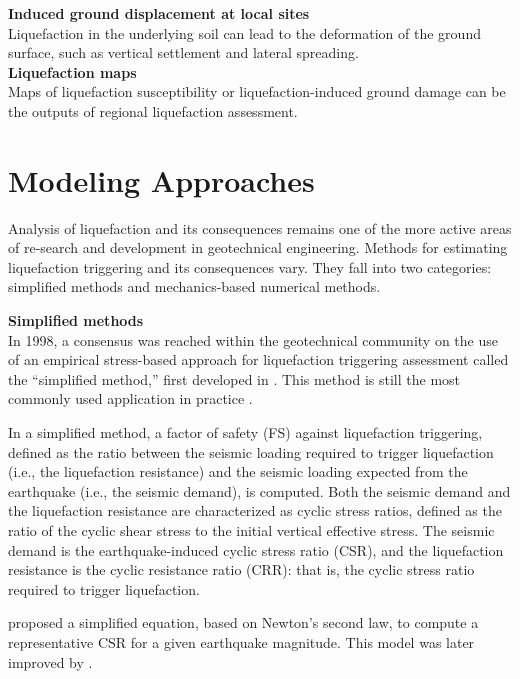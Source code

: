 \noindent\textbf{Induced ground displacement at local sites}\\
Liquefaction in the underlying soil can lead to the deformation of the ground surface, such as vertical settlement and lateral spreading. \\

\noindent\textbf{Liquefaction maps}\\
Maps of liquefaction susceptibility or liquefaction-induced ground damage can be the outputs of regional liquefaction assessment. 

\section{Modeling Approaches}
\label{sec:eq_liq_methods}

Analysis of liquefaction and its consequences remains one of the more active areas of re-search and development in geotechnical engineering. Methods for estimating liquefaction triggering and its consequences vary. They fall into two categories: simplified methods and mechanics-based numerical methods.
\newline

\noindent\textbf{Simplified methods} \\
In 1998, a consensus was reached within the geotechnical community on the use of an empirical stress-based approach for liquefaction triggering assessment called the “simplified method,” first developed in \cite{seed1971simplified}. This method is still the most commonly used application in practice \citep{youd2001liquefaction,national2016state}.

In a simplified method, a factor of safety (FS) against liquefaction triggering, defined as the ratio between the seismic loading required to trigger liquefaction (i.e., the liquefaction resistance) and the seismic loading expected from the earthquake (i.e., the seismic demand), is computed. Both the seismic demand and the liquefaction resistance are characterized as cyclic stress ratios, defined as the ratio of the cyclic shear stress to the initial vertical effective stress. The seismic demand is the earthquake-induced cyclic stress ratio (CSR), and the liquefaction resistance is the cyclic resistance ratio (CRR): that is, the cyclic stress ratio required to trigger liquefaction. 

\cite{seed1971simplified} proposed a simplified equation, based on Newton’s second law, to compute a representative CSR for a given earthquake magnitude. This model was later improved by \cite{idriss1999update,cetin2004nonlinear,idriss2008soil,boulanger2014cpt}.

